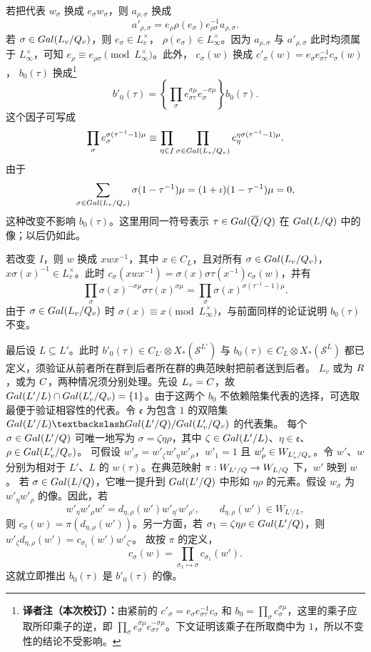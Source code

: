 若把代表 $w_\sigma$ 换成 $e_\sigma w_\sigma$，则 $a_{\rho,\sigma}$ 换成
\[
a'_{\rho,\sigma}=e_\rho\rho(e_\sigma)e_{\rho\sigma}^{-1}a_{\rho,\sigma}.
\]
若 $\sigma\in Gal(L_v/Q_v)$，则 $e_\sigma\in L_v^\times$，
$\rho(e_\sigma)\in L_\infty^\times$。因为 $a_{\rho,\sigma}$ 与
$a'_{\rho,\sigma}$ 此时均须属于 $L_\infty^\times$，可知
$e_\rho\equiv e_{\rho\sigma}\pmod{L_\infty^\times}$。此外，
$c_\sigma(w)$ 换成 $c'_\sigma(w)=e_\sigma e_{\sigma\tau}^{-1}c_\sigma(w)$，
$b_0(\tau)$ 换成\footnote{\textbf{译者注（本次校订）：}由紧前的 $c'_\sigma=e_\sigma e_{\sigma\tau}^{-1}c_\sigma$ 和 $b_0=\prod_\sigma c_\sigma^{\sigma\mu}$，这里的乘子应取所印乘子的逆，即 $\prod_\sigma e_\sigma^{\sigma\mu}e_{\sigma\tau}^{-\sigma\mu}$。下文证明该乘子在所取商中为 $1$，所以不变性的结论不受影响。}
\[
b'_0(\tau)=\left\{\prod_\sigma e_{\sigma\tau}^{\sigma\mu}
 e_\sigma^{-\sigma\mu}\right\}b_0(\tau).
\]
这个因子可写成
\[
\prod_\sigma e_\sigma^{\sigma(\tau^{-1}-1)\mu}
\equiv\prod_{\eta\in f}\prod_{\sigma\in Gal(L_v/Q_v)}
e_\eta^{\eta\sigma(\tau^{-1}-1)\mu}.
\]
由于
\[
\sum_{\sigma\in Gal(L_v/Q_v)}\sigma(1-\tau^{-1})\mu
=(1+\iota)(1-\tau^{-1})\mu=0,
\]
这种改变不影响 $b_0(\tau)$。这里用同一符号表示
$\tau\in Gal(\overline{Q}/Q)$ 在 $Gal(L/Q)$ 中的像；以后仍如此。

若改变 $I$，则 $w$ 换成 $xwx^{-1}$，其中 $x\in C_L$，且对所有
$\sigma\in Gal(L_v/Q_v)$，$x\sigma(x)^{-1}\in L_v^\times$。此时
$c_\sigma(xwx^{-1})=\sigma(x)\sigma\tau(x^{-1})c_\sigma(w)$，并有
\[
\prod_\sigma\sigma(x)^{-\sigma\mu}\sigma\tau(x)^{\sigma\mu}
=\prod_\sigma\sigma(x)^{\sigma(\tau^{-1}-1)\mu}.
\]
由于 $\sigma\in Gal(L_v/Q_v)$ 时
$\sigma(x)\equiv x\pmod{L_\infty^\times}$，与前面同样的论证说明 $b_0(\tau)$ 不变。

最后设 $L\subseteq L'$。此时
$b'_0(\tau)\in C_{L'}\otimes X_*(\mathcal S^{L'})$ 与
$b_0(\tau)\in C_L\otimes X_*(\mathcal S^L)$ 都已定义，须验证从前者所在群到后者所在群的典范映射把前者送到后者。
$L_v$ 或为 $R$，或为 $C$，两种情况须分别处理。先设 $L_v=C$，故
$Gal(L'/L)\cap Gal(L'_v/Q_v)=\{1\}$。由于这两个 $b_0$ 不依赖陪集代表的选择，可选取最便于验证相容性的代表。令
$\mathfrak e$ 为包含 $1$ 的双陪集
$\Gal(L'/L)\backslash\Gal(L'/\Q)/\Gal(L'_v/\Q_v)$ 的代表集。
每个 $\sigma\in Gal(L'/Q)$ 可唯一地写为
$\sigma=\zeta\eta\rho$，其中
$\zeta\in Gal(L'/L)$、$\eta\in\mathfrak e$、$\rho\in Gal(L'_v/Q_v)$。
可假设 $w'_\sigma=w'_\zeta w'_\eta w'_\rho$，$w'_1=1$ 且
$w'_\rho\in W_{L'_v/Q_v}$。令 $w'$、$w$ 分别为相对于 $L'$、$L$ 的
$w(\tau)$。在典范映射 $\pi:W_{L'/Q}\to W_{L/Q}$ 下，$w'$ 映到 $w$。
若 $\sigma\in Gal(L/Q)$，它唯一提升到 $Gal(L'/Q)$ 中形如 $\eta\rho$ 的元素。假设
$w_\sigma$ 为 $w'_\eta w'_\rho$ 的像。因此，若
\[
w'_\eta w'_\rho w'=d_{\eta,\rho}(w')w'_{\eta'}w'_{\rho'},
\qquad d_{\eta,\rho}(w')\in W_{L'/L},
\]
则 $c_\sigma(w)=\pi(d_{\eta,\rho}(w'))$。另一方面，若
$\sigma_1=\zeta\eta\rho\in Gal(L'/Q)$，则
$w'_\zeta d_{\eta,\rho}(w')=c_{\sigma_1}(w')w'_{\zeta'}$。
故按 $\pi$ 的定义，
\[
c_\sigma(w)=\prod_{\sigma_1\mapsto\sigma}c_{\sigma_1}(w').
\]
这就立即推出 $b_0(\tau)$ 是 $b'_0(\tau)$ 的像。

